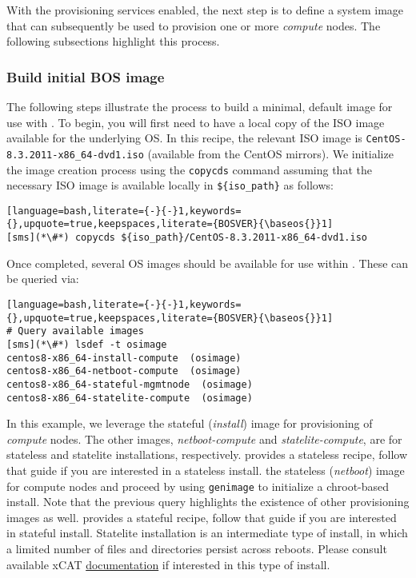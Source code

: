 
With the provisioning services enabled, the next step is to define
a system image that can subsequently be
used to provision one or more {\em compute} nodes. The following subsections highlight this process.

\subsubsection{Build initial BOS image} \label{sec:assemble_bos}
The following steps illustrate the process to build a minimal, default image for use with \xCAT{}. To begin, you will
first need to have a local copy of the ISO image available for the underlying OS. In this recipe, the relevant ISO image
is \texttt{CentOS-8.3.2011-x86\_64-dvd1.iso} (available from the CentOS mirrors). We initialize the image
creation process using the \texttt{copycds} command assuming that the necessary ISO image is available locally in 
\texttt{\$\{iso\_path\}} as follows:

\begin{lstlisting}[language=bash,literate={-}{-}1,keywords={},upquote=true,keepspaces,literate={BOSVER}{\baseos{}}1]
[sms](*\#*) copycds ${iso_path}/CentOS-8.3.2011-x86_64-dvd1.iso
\end{lstlisting}

\noindent Once completed, several OS images should be available for use within \xCAT{}. These can be queried via:

\begin{lstlisting}[language=bash,literate={-}{-}1,keywords={},upquote=true,keepspaces,literate={BOSVER}{\baseos{}}1]
# Query available images
[sms](*\#*) lsdef -t osimage
centos8-x86_64-install-compute  (osimage)
centos8-x86_64-netboot-compute  (osimage)
centos8-x86_64-stateful-mgmtnode  (osimage)
centos8-x86_64-statelite-compute  (osimage)
\end{lstlisting}

In this example, we leverage
the stateful ({\em install}) image for provisioning of {\em
compute} nodes.  The other images, {\em
netboot-compute} and {\em statelite-compute}, are for stateless and statelite
installations, respectively. \OHPC{} provides a stateless \xCAT{} recipe,
follow that guide if you are interested in a stateless install.
\else
the stateless ({\em netboot}) image for compute nodes and proceed by using
\texttt{genimage} to initialize a chroot-based install. Note that the previous query highlights the existence of other
provisioning images as well. \OHPC{} provides a stateful \xCAT{} recipe, 
follow that guide if you are interested in  stateful install.
\fi
Statelite installation is an intermediate type of install, in which a limited
number of files and directories persist across reboots.  Please consult
available xCAT \href{https://xcat-docs.readthedocs.io/en/stable/}{\color{blue}
documentation} if interested in this type of install.
